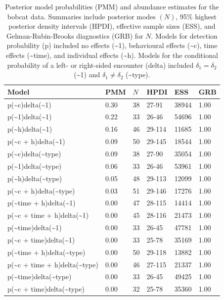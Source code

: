 \documentclass[12pt]{article}
\begin{document}
\clearpage

\begin{table}[ht]
\centering
\begin{tabular}{llllll}
  \hline
Model & PMM & $N$ & HPDI & ESS & GRB \\ 
  \hline
p(\~{}c)delta(\~{}1) & 0.30 & 38 & 27-91 & 38944 & 1.00 \\ 
  p(\~{}1)delta(\~{}1) & 0.22 & 33 & 26-46 & 54696 & 1.00 \\ 
  p(\~{}h)delta(\~{}1) & 0.16 & 46 & 29-114 & 11685 & 1.00 \\ 
  p(\~{}c + h)delta(\~{}1) & 0.09 & 50 & 29-145 & 18544 & 1.00 \\ 
  p(\~{}c)delta(\~{}type) & 0.09 & 38 & 27-90 & 35054 & 1.00 \\ 
  p(\~{}1)delta(\~{}type) & 0.06 & 33 & 26-46 & 53961 & 1.00 \\ 
  p(\~{}h)delta(\~{}type) & 0.05 & 48 & 29-113 & 12099 & 1.00 \\ 
  p(\~{}c + h)delta(\~{}type) & 0.03 & 51 & 29-146 & 17276 & 1.00 \\ 
  p(\~{}time + h)delta(\~{}1) & 0.00 & 47 & 28-115 & 14414 & 1.00 \\ 
  p(\~{}c + time + h)delta(\~{}1) & 0.00 & 45 & 28-116 & 21473 & 1.00 \\ 
  p(\~{}time)delta(\~{}1) & 0.00 & 33 & 26-45 & 47781 & 1.00 \\ 
  p(\~{}c + time)delta(\~{}1) & 0.00 & 33 & 25-78 & 35169 & 1.00 \\ 
  p(\~{}time + h)delta(\~{}type) & 0.00 & 50 & 29-118 & 13882 & 1.00 \\ 
  p(\~{}c + time + h)delta(\~{}type) & 0.00 & 46 & 27-115 & 21337 & 1.00 \\ 
  p(\~{}time)delta(\~{}type) & 0.00 & 33 & 26-45 & 49425 & 1.00 \\ 
  p(\~{}c + time)delta(\~{}type) & 0.00 & 32 & 25-78 & 35360 & 1.00 \\ 
   \hline
\end{tabular}
\caption{Posterior model probabilities (PMM) and abundance estimates for the bobcat data. Summaries include posterior modes $(N)$, 95\% highest posterior density intervals (HPDI), effective sample sizes (ESS), and Gelman-Rubin-Brooks diagnostics (GRB) for $N$. Models for detection probability (p) included no effects (\~{}1), behavioural effects (\~{}c), time effects (\~{}time), and individual effects (\~{}h). Models for the conditional probability of a left- or right-sided encounter (delta) included $\delta_1=\delta_2$ (\~{}1) and $\delta_1 \ne \delta_2$ (\~{}type).} 
\label{tab:modprobs}
\end{table}
\clearpage
\end{document}
